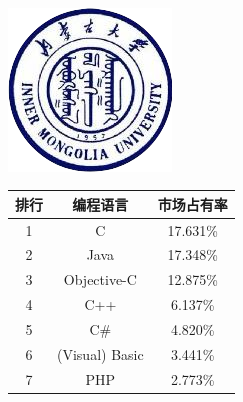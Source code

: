 \\[\intextsep] 
    \begin{minipage}{0.5\textwidth} 
        \centering
        \includegraphics{figure/emblem.png}
        \label{fig:emblem} 
    \end{minipage}
    \begin{minipage}{0.5\textwidth}
        \centering 
        \begin{tabular}{|c|c|c|}
            \hline
                排行 & 编程语言 & 市场占有率 \\
            \hline
                1 & C & 17.631\%    \\
                2 & Java & 17.348\% \\
                3 & Objective-C & 12.875\% \\
                4 & C++ & 6.137\% \\
                5 & C\# & 4.820\% \\
                6 & (Visual) Basic & 3.441\% \\
                7 & PHP & 2.773\% \\
            \hline
        \end{tabular}
        \label{tab:presidents}
    \end{minipage}
\\[\intextsep] 